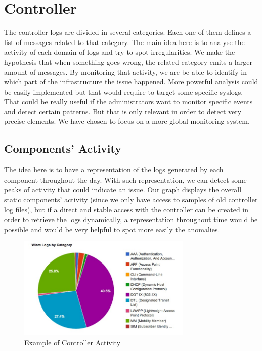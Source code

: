 \section{Controller}
The controller logs are divided in several categories. Each one of them defines a list of messages related to that category. The main idea here is to analyse the activity of each domain of logs and try to spot irregularities. We make the hypothesis that when something goes wrong, the related category emits a larger amount of messages. By monitoring that activity, we are be able to identify in which part of the infrastructure the issue happened. More powerful analysis could be easily implemented but that would require to target some specific syslogs. That could be really useful if the administrators want to monitor specific events and detect certain patterns. But that is only relevant in order to detect very precise elements. We have chosen to focus on a more global monitoring system.


\subsection{Components' Activity}
The idea here is to have a representation of the logs generated by each component throughout the day. With such representation, we can detect some peaks of activity that could indicate an issue. Our graph displays the overall static components' activity (since we only have access to samples of old controller log files), but if a direct and stable access with the controller can be created in order to retrieve the logs dynamically, a representation throughout time would be possible and would be very helpful to spot more easily the anomalies.

\begin{figure}[H]
	\centering
   \includegraphics[width=0.74\textwidth]{Pictures/chapter5/controller.png}
   \caption{Example of Controller Activity}
\end{figure}

